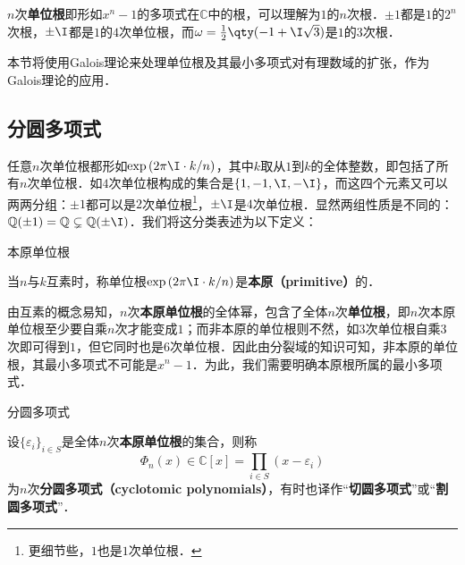 



$n$次\textbf{单位根}即形如$x^n-1$的多项式在$\mathbb{C}$中的根，可以理解为$1$的$n$次根．$\pm 1$都是$1$的$2^n$次根，$\pm \I$都是$1$的$4$次单位根，而$\omega=\frac{1}{2}\qty(-1+\I\sqrt{3})$是$1$的$3$次根．

本节将使用Galois理论来处理单位根及其最小多项式对有理数域的扩张，作为Galois理论的应用．


\subsection{分圆多项式}

任意$n$次单位根都形如$\exp{(2\pi\I\cdot  k/n)}$，其中$k$取从$1$到$k$的全体整数，即包括了所有$n$次单位根．如$4$次单位根构成的集合是$\{1, -1, \I, -\I\}$，而这四个元素又可以两两分组：$\pm 1$都可以是$2$次单位根\footnote{更细节些，$1$也是$1$次单位根．}，$\pm \I$是$4$次单位根．显然两组性质是不同的：$\mathbb{Q}(\pm 1)=\mathbb{Q}\subsetneq \mathbb{Q}(\pm\I)$．我们将这分类表述为以下定义：

\begin{definition}{本原单位根}\label{Cycltm_def2}

当$n$与$k$互素时，称单位根$\exp{(2\pi\I\cdot  k/n)}$是\textbf{本原（primitive）}的．

\end{definition}

由互素的概念易知，$n$次\textbf{本原单位根}的全体幂，包含了全体$n$次\textbf{单位根}，即$n$次本原单位根至少要自乘$n$次才能变成$1$；而非本原的单位根则不然，如$3$次单位根自乘$3$次即可得到$1$，但它同时也是$6$次单位根．因此由分裂域的知识可知，非本原的单位根，其最小多项式不可能是$x^n-1$．为此，我们需要明确本原根所属的最小多项式．

\begin{definition}{分圆多项式}\label{Cycltm_def1}

设$\{\varepsilon_i\}_{i\in S}$是全体$n$次\textbf{本原单位根}的集合，则称
\begin{equation}
\Phi_n(x)\in \mathbb{C}[x] = \prod_{i\in S}(x-\varepsilon_i)
\end{equation}
为$n$次\textbf{分圆多项式（cyclotomic polynomials）}，有时也译作“\textbf{切圆多项式}”或“\textbf{割圆多项式}”．

\end{definition}

